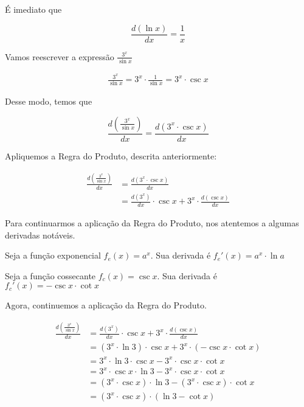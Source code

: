 \documentclass{article}
\begin{document}
É imediato que

\begin{equation}\label{eq:q2_derivada_lnx}
    \frac{d (\ln x)}{dx} = \frac{1}{x}
\end{equation}

Vamos reescrever a expressão \(\frac{3^x}{\sin x}\)

\begin{align*}
    \frac{3^x}{\sin x} = 3^x \cdot \frac{1}{\sin x} = 3^x \cdot \csc x
\end{align*}

Desse modo, temos que

\[
    \frac{d (\frac{3^x}{\sin x})}{dx} = \frac{d (3^x \cdot \csc x)}{dx}
\]

Apliquemos a Regra do Produto, descrita anteriormente:

\begin{align*}
    \frac{d (\frac{3^x}{\sin x})}{dx}
     & = \frac{d (3^x \cdot \csc x)}{dx}                                    \\
     & = \frac{d (3^x)}{dx} \cdot \csc x +  3^x \cdot \frac{d (\csc x)}{dx}
\end{align*}

Para continuarmos a aplicação da Regra do Produto,
nos atentemos a algumas derivadas notáveis.

Seja a função exponencial \(f_e(x) = a^x\).
Sua derivada é \(f_e'(x) = a^x \cdot \ln a\)

Seja a função cossecante \(f_{c}(x) = \csc x\).
Sua derivada é \(f_{c}'(x) = -\csc x \cdot \cot x\)

Agora, continuemos a aplicação da Regra do Produto.

\begin{align*}
    \frac{d (\frac{3^x}{\sin x})}{dx}
     & = \frac{d (3^x)}{dx} \cdot \csc x +  3^x \cdot \frac{d (\csc x)}{dx} \\
     & = (3^x \cdot \ln 3) \cdot \csc x + 3^x \cdot (-\csc x \cdot \cot x)  \\
     & = 3^x \cdot \ln 3 \cdot \csc x - 3^x \cdot \csc x \cdot \cot x       \\
     & = 3^x \cdot \csc x  \cdot \ln 3 - 3^x \cdot \csc x \cdot \cot x      \\
     & = (3^x \cdot \csc x)  \cdot \ln 3 - (3^x \cdot \csc x) \cdot \cot x  \\
     & = (3^x \cdot \csc x) \cdot (\ln 3 - \cot x)                          \\
\end{align*}
\end{document}
